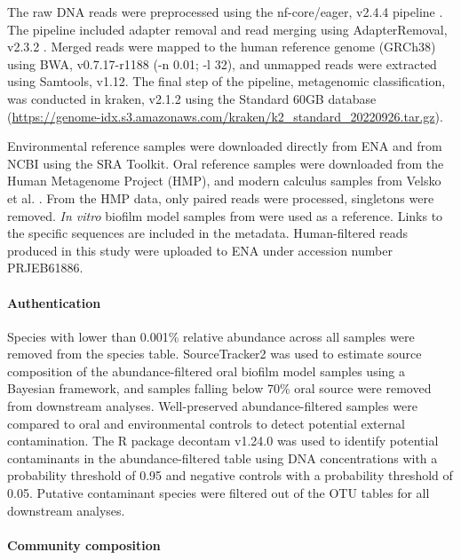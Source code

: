 \documentclass[10pt,a4paper]{article}
\begin{document}
The raw DNA reads were preprocessed using the nf-core/eager, v2.4.4
pipeline \citep{yatesEAGER2020}. The pipeline included adapter removal
and read merging using AdapterRemoval, v2.3.2 \citep{AdapterRemovalv2}.
Merged reads were mapped to the human reference genome (GRCh38) using
BWA, v0.7.17-r1188 \citep{BWA} (-n 0.01; -l 32), and unmapped reads were
extracted using Samtools, v1.12. The final step of the pipeline,
metagenomic classification, was conducted in kraken, v2.1.2
\citep{kraken2} using the Standard 60GB database
(\url{https://genome-idx.s3.amazonaws.com/kraken/k2_standard_20220926.tar.gz}).

Environmental reference samples were downloaded directly from ENA and
from NCBI using the SRA Toolkit. Oral reference samples were downloaded
from the Human Metagenome Project (HMP), and modern calculus samples
from Velsko et al. \citep{velskoDentalCalculus2017}. From the HMP
data, only paired reads were processed, singletons were removed.
\emph{In vitro} biofilm model samples from
\citep{edlundUncoveringComplex2018} were used as a reference. Links to
the specific sequences are included in the metadata. Human-filtered
reads produced in this study were uploaded to ENA under accession number
PRJEB61886.

\paragraph{Authentication}\label{authentication}

Species with lower than 0.001\% relative abundance across all samples
were removed from the species table. SourceTracker2
\citep{knightsSourceTracker2011} was used to estimate source composition
of the abundance-filtered oral biofilm model samples using a Bayesian
framework, and samples falling below 70\% oral source were removed from
downstream analyses. Well-preserved abundance-filtered samples were
compared to oral and environmental controls to detect potential external
contamination. The R package decontam v1.24.0 \citep{Rdecontam} was used
to identify potential contaminants in the abundance-filtered table using
DNA concentrations with a probability threshold of 0.95 and negative
controls with a probability threshold of 0.05. Putative contaminant
species were filtered out of the OTU tables for all downstream analyses.

\paragraph{Community composition}\label{community-composition}
\end{document}
